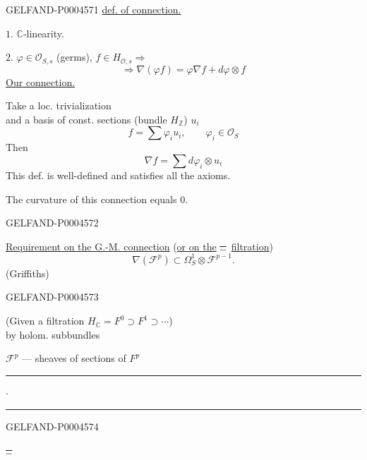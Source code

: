 \begin{GelfandAdjacentEvidence}{GELFAND-P000457}{1}
\underline{def. of connection.}

$1.$ $\mathbb C$-linearity.

$2.$ $\varphi\in\mathcal O_{S,s}$ (germs), $f\in H_{\mathcal O,s}\Rightarrow$
\[
\Rightarrow\nabla(\varphi f)=\varphi\nabla f+d\varphi\otimes f
\]
\underline{Our connection.}

Take a loc. trivialization\\
and a basis of const. sections (bundle $H_{\mathbb Z}$) $u_i$
\[
f=\sum\varphi_i u_i,\qquad\varphi_i\in\mathcal O_S
\]
Then
\[
\nabla f=\sum d\varphi_i\otimes u_i
\]
This def. is well-defined and satisfies all the axioms.

The curvature of this connection equals $0$.
\end{GelfandAdjacentEvidence}
\begin{GelfandAdjacentEvidence}{GELFAND-P000457}{2}


\underline{Requirement on the G.-M. connection}\quad
(\underline{or on the} \sout{\ldots}\ \underline{filtration})
\[
\nabla(\mathcal F^p)\subset\Omega_S^1\otimes\mathcal F^{p-1}.
\]
\hfill(Griffiths)\par
{}
\end{GelfandAdjacentEvidence}
\begin{GelfandAdjacentEvidence}{GELFAND-P000457}{3}


(Given a filtration $H_{\mathbb C}=F^0\supset F^1\supset\cdots$)\\
\hspace*{4em}by holom. subbundles

$\mathcal F^p$ — sheaves of sections of $F^p$

\begin{center}
\rule[.5ex]{15mm}{.35pt}\enspace$\cdot$\enspace\rule[.5ex]{22mm}{.35pt}
\end{center}

\end{GelfandAdjacentEvidence}
\begin{GelfandAdjacentEvidence}{GELFAND-P000457}{4}


\sout{\ldots}
\end{GelfandAdjacentEvidence}
